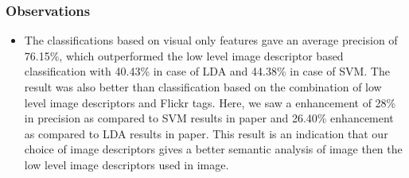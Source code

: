 \subsubsection*{Observations}
\begin{itemize}
\item The classifications based on visual only features gave an average precision of 76.15\%, which outperformed the low level image 
descriptor based classification with 40.43\% in case of LDA and 44.38\% in case of SVM. The result was also better than classification based on the combination of low level image descriptors and Flickr tags. Here, we saw a enhancement of 28\% in precision as compared to SVM results in paper and 26.40\% enhancement as compared to LDA results in paper. This result is an indication that our choice of image descriptors gives a better semantic analysis of image then the low level image descriptors used in image.







\end{itemize}
